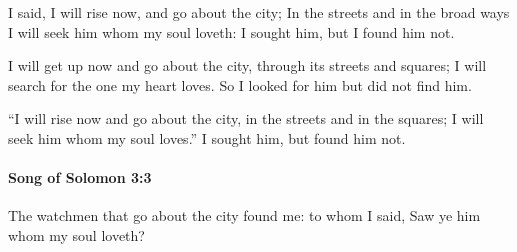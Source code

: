 			\begin{versebox}
					\item[BHS] 
					\item[LXX] 
					\item[ASV] I said, I will rise now, and go about the city; In the streets and in the broad ways I will seek him whom my soul loveth: I sought him, but I found him not.
					\item[NIV] I will get up now and go about the city, through its streets and squares; I will search for the one my heart loves. So I looked for him but did not find him.
					\item[NRSV] “I will rise now and go about the city, in the streets and in the squares; I will seek him whom my soul loves.” I sought him, but found him not.
			\end{versebox}

		\paragraph{Song of Solomon 3:3} %
			\label{SONGOFSOLOMON-3-3}

			The watchmen that go about the city found me: to whom I said, Saw ye him whom my soul loveth?


